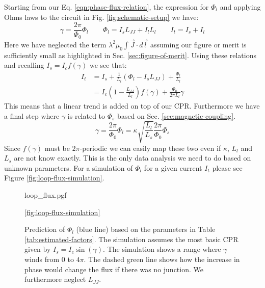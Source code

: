 Starting from our Eq. \ref{eqn:phase-flux-relation}, the expression for $\Phi_l$ and applying Ohms laws to the circuit in Fig. \ref{fig:schematic-setup} we have:
\begin{equation}
	\gamma = \frac{2\pi}{\Phi_0}\Phi_l \qquad \Phi_l = I_sL_{JJ} + I_lL_l \qquad I_t = I_s + I_l
\end{equation}
Here we have neglected the term $\lambda^2\mu_0 \int \vec{J}\cdot d \vec{l}$ assuming our figure or merit is sufficiently small as highlighted in Sec. \ref{sec:figure-of-merit}. Using these relations and recalling $I_s = I_cf(\gamma)$ we see that:
\begin{align}
	I_t &= I_s + \frac{1}{L_l}\left(\Phi_l - I_sL_{JJ}\right) + \frac{\Phi_l}{L_l} \nonumber \\
	    &= I_c \left(1 - \frac{L_{JJ}}{L_l}\right)f(\gamma) + \frac{\Phi_0}{2\pi L_l}\gamma
\end{align}
This means that a linear trend is added on top of our CPR. Furthermore we have a final step where $\gamma$ is related to $\Phi_s$ based on Sec. \ref{sec:magnetic-coupling}.
\begin{equation}
	\gamma = \frac{2\pi}{\Phi_0}\Phi_l = \kappa \sqrt{\frac{L_l}{L_s}} \frac{2\pi}{\Phi_0} \Phi_s
\end{equation}
Since $f(\gamma)$ must be $2\pi$-periodic we can easily map these two even if $\kappa$, $L_l$ and $L_s$ are not know exactly. This is the only data analysis we need to do based on unknown parameters. For a simulation of $\Phi_l$ for a given current $I_t$ please see Figure \ref{fig:loop-flux-simulation}.

\begin{figure}
	\centering
	{loop_flux.pgf}
	\caption{Prediction of $\Phi_l$ (blue line) based on the parameters in Table \ref{tab:estimated-factors}. The simulation assumes the most basic CPR given by $I_s=I_c\sin(\gamma)$. The simulation shows a range where $\gamma$ winds from $0$ to $4\pi$. The dashed green line shows how the increase in phase would change the flux if there was no junction. We furthermore neglect $L_{JJ}$.}
	\ref{fig:loop-flux-simulation}
\end{figure}